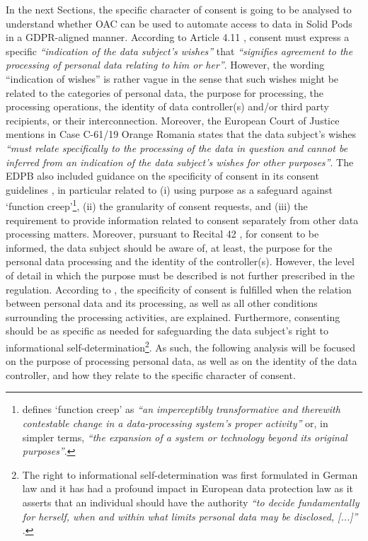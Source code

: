 In the next Sections, the specific character of consent is going to be analysed to understand whether OAC can be used to automate access to data in Solid Pods in a GDPR-aligned manner.
According to Article 4.11 \citeyearpar{noauthor_regulation_2016}, consent must express a specific \textit{``indication of the data subject’s wishes''} that \textit{``signifies agreement to the processing of personal data relating to him or her''}.
However, the wording ``indication of wishes'' is rather vague in the sense that such wishes might be related to the categories of personal data, the purpose for processing, the processing operations, the identity of data controller(s) and/or third party recipients, or their interconnection.
Moreover, the European Court of Justice mentions in Case C-61/19 Orange Romania \citeyearpar{noauthor_orange_2020} states that the data subject’s wishes \textit{``must relate specifically to the processing of the data in question and cannot be inferred from an indication of the data subject’s wishes for other purposes''}.
The EDPB also included guidance on the specificity of consent in its consent guidelines \citep{european_data_protection_board_guidelines_2020}, in particular related to (i) using purpose as a safeguard against `function creep'\footnote{\cite{koops_concept_2021} defines `function creep' as \textit{``an imperceptibly transformative and therewith contestable change in a data-processing system's proper activity''} or, in simpler terms, \textit{``the expansion of a system or technology beyond its original purposes''}.}, (ii) the granularity of consent requests, and (iii) the requirement to provide information related to consent separately from other data processing matters.
Moreover, pursuant to Recital 42 \citeyearpar{noauthor_regulation_2016}, for consent to be informed, the data subject should be aware of, at least, the purpose for the personal data processing and the identity of the controller(s). 
However, the level of detail in which the purpose must be described is not further prescribed in the regulation.
According to \cite{kosta_consent_2013}, the specificity of consent is fulfilled when the relation between personal data and its processing, as well as all other conditions surrounding the processing activities, are explained.
Furthermore, consenting should be as specific as needed for safeguarding the data subject's right to informational self-determination\footnote{The right to informational self-determination was first formulated in German law and it has had a profound impact in European data protection law as it asserts that an individual should have the authority \textit{``to decide fundamentally for herself, when and within what limits personal data may be disclosed, [...]''} \citep{vivarelli_crisis_2020}.}.
As such, the following analysis will be focused on the purpose of processing personal data, as well as on the identity of the data controller, and how they relate to the specific character of consent.


